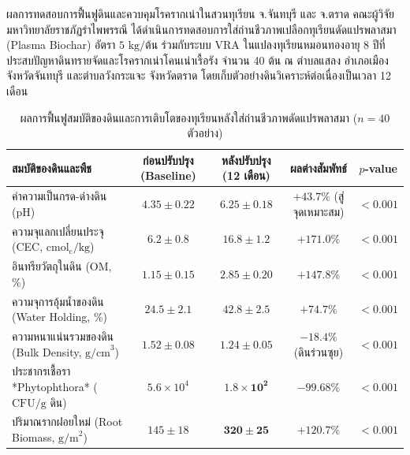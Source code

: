\begin{agribox}{ผลการทดสอบการฟื้นฟูดินและควบคุมโรครากเน่าในสวนทุเรียน จ.จันทบุรี และ จ.ตราด}
คณะผู้วิจัย มหาวิทยาลัยราชภัฏรำไพพรรณี ได้ดำเนินการทดสอบการใส่ถ่านชีวภาพเปลือกทุเรียนดัดแปรพลาสมา (Plasma Biochar) อัตรา $5 \text{ kg/ต้น}$ ร่วมกับระบบ VRA ในแปลงทุเรียนหมอนทองอายุ 8 ปีที่ประสบปัญหาดินทรายจัดและโรครากเน่าโคนเน่าเรื้อรัง จำนวน 40 ต้น ณ ตำบลแสลง อำเภอเมือง จังหวัดจันทบุรี และตำบลวังกระแจะ จังหวัดตราด โดยเก็บตัวอย่างดินวิเคราะห์ต่อเนื่องเป็นเวลา 12 เดือน

\begin{table}[H]
\centering
\small
\caption{ผลการฟื้นฟูสมบัติของดินและการเติบโตของทุเรียนหลังใส่ถ่านชีวภาพดัดแปรพลาสมา ($n = 40$ ตัวอย่าง)}
\label{tab:ch09_soil_durian}
\begin{tabular}{lcccc}
\toprule
\textbf{สมบัติของดินและพืช} & \textbf{ก่อนปรับปรุง (Baseline)} & \textbf{หลังปรับปรุง (12 เดือน)} & \textbf{ผลต่างสัมพัทธ์} & \textbf{$p$-value} \\
\midrule
ค่าความเป็นกรด-ด่างดิน (pH) & $4.35 \pm 0.22$ & $\mathbf{6.25 \pm 0.18}$ & $+43.7\%$ (สู่จุดเหมาะสม) & $<0.001$ \\
ความจุแลกเปลี่ยนประจุ (CEC, $\text{cmol}_{\text{c}}/\text{kg}$) & $6.2 \pm 0.8$ & $\mathbf{16.8 \pm 1.2}$ & $+171.0\%$ & $<0.001$ \\
อินทรียวัตถุในดิน (OM, \%) & $1.15 \pm 0.15$ & $\mathbf{2.85 \pm 0.20}$ & $+147.8\%$ & $<0.001$ \\
ความจุการอุ้มน้ำของดิน (Water Holding, \%) & $24.5 \pm 2.1$ & $\mathbf{42.8 \pm 2.5}$ & $+74.7\%$ & $<0.001$ \\
ความหนาแน่นรวมของดิน (Bulk Density, $\text{g/cm}^3$) & $1.52 \pm 0.08$ & $\mathbf{1.24 \pm 0.05}$ & $-18.4\%$ (ดินร่วนซุย) & $<0.001$ \\
ประชากรเชื้อรา *Phytophthora* ($\text{CFU/g}$ ดิน) & $5.6 \times 10^4$ & $\mathbf{1.8 \times 10^2}$ & $-99.68\%$ & $<0.001$ \\
ปริมาณรากฝอยใหม่ (Root Biomass, $\text{g/m}^2$) & $145 \pm 18$ & $\mathbf{320 \pm 25}$ & $+120.7\%$ & $<0.001$ \\
\bottomrule
\end{tabular}
\end{table}


\end{agribox}
